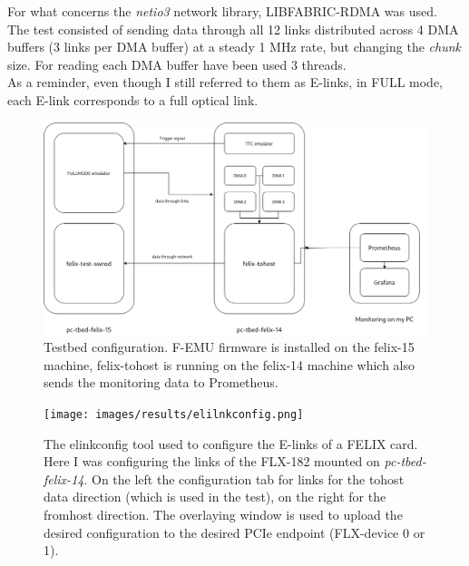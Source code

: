 For what concerns the \emph{netio3} network library, LIBFABRIC-RDMA was used.\\
The test consisted of sending data through all 12 links distributed across 4 \acs{DMA} buffers (3 links per \acs{DMA} buffer) at a steady 1 MHz rate, but changing the \emph{chunk} size. For reading each DMA buffer have been used 3 threads.\\
As a reminder, even though I still referred to them as \acs{E-link}s, in FULL mode, each \acs{E-link} corresponds to a full optical link.

\begin{figure}[htbp]
\centering
\includegraphics[width=\textwidth]{images/results/tohost-tbed-setup.png}
\caption[Testbed configuration]{Testbed configuration. F-EMU firmware is installed on the felix-15 machine, felix-tohost is running on the felix-14 machine which also sends the monitoring data to Prometheus.}
\label{fig:tbed-setup}
\end{figure}

\begin{figure}[htbp]
\centering
\texttt{[image: images/results/elilnkconfig.png]}
\caption[elinkconfig]{The elinkconfig tool used to configure the \acs{E-link}s of a \acs{FELIX} card. Here I was configuring the links of the FLX-182 mounted on \emph{pc-tbed-felix-14}. On the left the configuration tab for links for the tohost data direction (which is used in the test), on the right for the fromhost direction. The overlaying window is used to upload the desired configuration to the desired PCIe endpoint (FLX-device 0 or 1).}
\label{fig:elinkconfig}
\end{figure}

